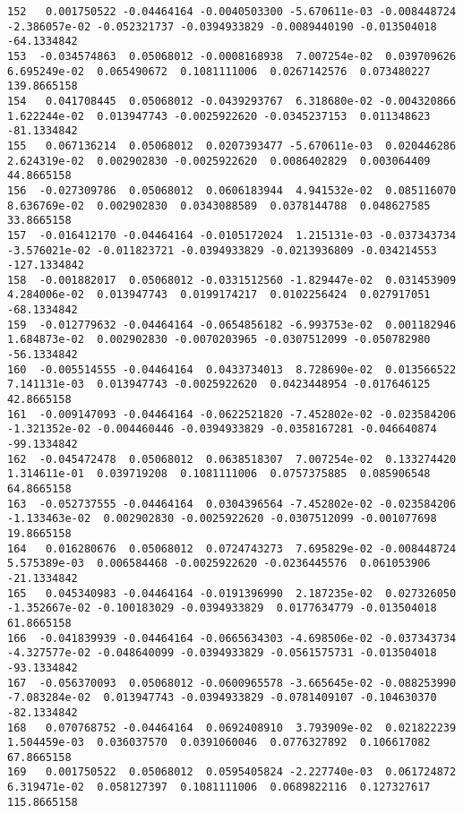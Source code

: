 \documentclass[15pt,a4paper,openright]{article}
\begin{document}
\begin{lstlisting}[language=AMPL, caption = data file]
152   0.001750522 -0.04464164 -0.0040503300 -5.670611e-03 -0.008448724 -2.386057e-02 -0.052321737 -0.0394933829 -0.0089440190 -0.013504018  -64.1334842
153  -0.034574863  0.05068012 -0.0008168938  7.007254e-02  0.039709626  6.695249e-02  0.065490672  0.1081111006  0.0267142576  0.073480227  139.8665158
154   0.041708445  0.05068012 -0.0439293767  6.318680e-02 -0.004320866  1.622244e-02  0.013947743 -0.0025922620 -0.0345237153  0.011348623  -81.1334842
155   0.067136214  0.05068012  0.0207393477 -5.670611e-03  0.020446286  2.624319e-02  0.002902830 -0.0025922620  0.0086402829  0.003064409   44.8665158
156  -0.027309786  0.05068012  0.0606183944  4.941532e-02  0.085116070  8.636769e-02  0.002902830  0.0343088589  0.0378144788  0.048627585   33.8665158
157  -0.016412170 -0.04464164 -0.0105172024  1.215131e-03 -0.037343734 -3.576021e-02 -0.011823721 -0.0394933829 -0.0213936809 -0.034214553 -127.1334842
158  -0.001882017  0.05068012 -0.0331512560 -1.829447e-02  0.031453909  4.284006e-02  0.013947743  0.0199174217  0.0102256424  0.027917051  -68.1334842
159  -0.012779632 -0.04464164 -0.0654856182 -6.993753e-02  0.001182946  1.684873e-02  0.002902830 -0.0070203965 -0.0307512099 -0.050782980  -56.1334842
160  -0.005514555 -0.04464164  0.0433734013  8.728690e-02  0.013566522  7.141131e-03  0.013947743 -0.0025922620  0.0423448954 -0.017646125   42.8665158
161  -0.009147093 -0.04464164 -0.0622521820 -7.452802e-02 -0.023584206 -1.321352e-02 -0.004460446 -0.0394933829 -0.0358167281 -0.046640874  -99.1334842
162  -0.045472478  0.05068012  0.0638518307  7.007254e-02  0.133274420  1.314611e-01  0.039719208  0.1081111006  0.0757375885  0.085906548   64.8665158
163  -0.052737555 -0.04464164  0.0304396564 -7.452802e-02 -0.023584206 -1.133463e-02  0.002902830 -0.0025922620 -0.0307512099 -0.001077698   19.8665158
164   0.016280676  0.05068012  0.0724743273  7.695829e-02 -0.008448724  5.575389e-03  0.006584468 -0.0025922620 -0.0236445576  0.061053906  -21.1334842
165   0.045340983 -0.04464164 -0.0191396990  2.187235e-02  0.027326050 -1.352667e-02 -0.100183029 -0.0394933829  0.0177634779 -0.013504018   61.8665158
166  -0.041839939 -0.04464164 -0.0665634303 -4.698506e-02 -0.037343734 -4.327577e-02 -0.048640099 -0.0394933829 -0.0561575731 -0.013504018  -93.1334842
167  -0.056370093  0.05068012 -0.0600965578 -3.665645e-02 -0.088253990 -7.083284e-02  0.013947743 -0.0394933829 -0.0781409107 -0.104630370  -82.1334842
168   0.070768752 -0.04464164  0.0692408910  3.793909e-02  0.021822239  1.504459e-03  0.036037570  0.0391060046  0.0776327892  0.106617082   67.8665158
169   0.001750522  0.05068012  0.0595405824 -2.227740e-03  0.061724872  6.319471e-02  0.058127397  0.1081111006  0.0689822116  0.127327617  115.8665158

\end{lstlisting}
\end{document}

